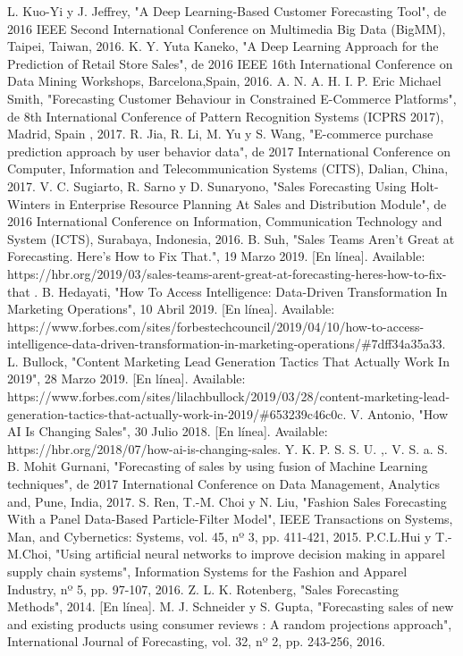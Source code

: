 \documentclass[conference]{IEEEtran}
\begin{document}
\begin{thebibliography}{00}
     L. Kuo-Yi y J. Jeffrey, "A Deep Learning-Based Customer Forecasting Tool", de 2016 IEEE Second International Conference on Multimedia Big Data (BigMM), Taipei, Taiwan, 2016.
     K. Y. Yuta Kaneko, "A Deep Learning Approach for the Prediction of Retail Store Sales", de 2016 IEEE 16th International Conference on Data Mining Workshops, Barcelona,Spain, 2016.
     A. N. A. H. I. P. Eric Michael Smith, "Forecasting Customer Behaviour in Constrained E-Commerce Platforms", de 8th   International Conference of Pattern Recognition Systems (ICPRS 2017), Madrid, Spain , 2017.
     R. Jia, R. Li, M. Yu y S. Wang, "E-commerce purchase prediction approach by user behavior data", de 2017 International Conference on Computer, Information and Telecommunication Systems (CITS), Dalian, China, 2017.
     V. C. Sugiarto, R. Sarno y D. Sunaryono, "Sales Forecasting Using Holt-Winters in Enterprise Resource Planning At Sales and Distribution Module", de 2016 International Conference on Information, Communication Technology and System (ICTS), Surabaya, Indonesia, 2016.
     B. Suh, "Sales Teams Aren’t Great at Forecasting. Here’s How to Fix That.", 19 Marzo 2019. [En línea]. Available: https://hbr.org/2019/03/sales-teams-arent-great-at-forecasting-heres-how-to-fix-that .
     B. Hedayati, "How To Access Intelligence: Data-Driven Transformation In Marketing Operations", 10 Abril 2019. [En línea]. Available: https://www.forbes.com/sites/forbestechcouncil/2019/04/10/how-to-access-intelligence-data-driven-transformation-in-marketing-operations/\#7dff34a35a33.
     L. Bullock, "Content Marketing Lead Generation Tactics That Actually Work In 2019", 28 Marzo 2019. [En línea]. Available: https://www.forbes.com/sites/lilachbullock/2019/03/28/content-marketing-lead-generation-tactics-that-actually-work-in-2019/\#653239c46c0c.
     V. Antonio, "How AI Is Changing Sales", 30 Julio 2018. [En línea]. Available: https://hbr.org/2018/07/how-ai-is-changing-sales.
     Y. K. P. S. S. U. ,. V. S. a. S. B. Mohit Gurnani, "Forecasting of sales by using fusion of Machine Learning techniques", de 2017 International Conference on Data Management, Analytics and, Pune, India, 2017.
     S. Ren, T.-M. Choi y N. Liu, "Fashion Sales Forecasting With a Panel Data-Based Particle-Filter Model", IEEE Transactions on Systems, Man, and Cybernetics: Systems, vol. 45, nº 3, pp. 411-421, 2015.
     P.C.L.Hui y T.-M.Choi, "Using artificial neural networks to improve decision making in apparel supply chain systems", Information Systems for the Fashion and Apparel Industry, nº 5, pp. 97-107, 2016.
     Z. L. K. Rotenberg, "Sales Forecasting Methods", 2014. [En línea].
     M. J. Schneider y S. Gupta, "Forecasting sales of new and existing products using consumer reviews : A random projections approach", International Journal of Forecasting, vol. 32, nº 2, pp. 243-256, 2016.

\end{thebibliography}
\end{document}
